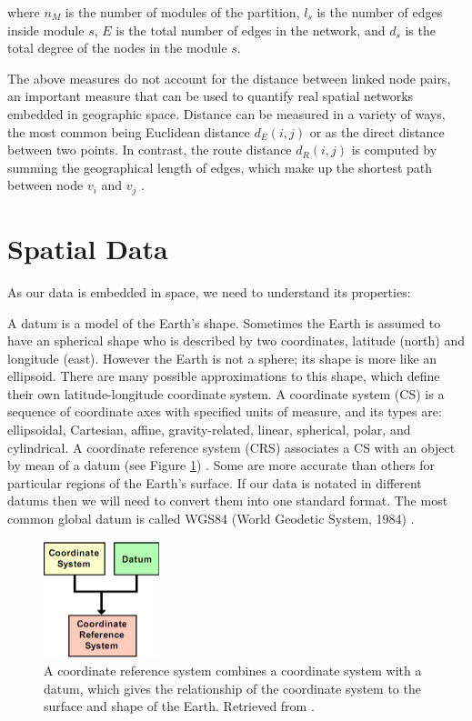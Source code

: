 where $n_M$ is the number of modules of the partition, $l_s$ is the number of edges inside module $s$, $E$ is the total number of edges in the network, and $d_s$ is the total degree of the nodes in the module $s$.

The above measures do not account for the distance between linked node pairs, an important measure that can be used to quantify real spatial networks embedded in geographic space. Distance can be measured in a variety of ways, the most common being Euclidean distance $d_E(i, j)$ or as the direct distance between two points. In contrast, the route distance $d_R(i, j)$ is computed by summing the geographical length of edges, which make up the shortest path between node $v_i$ and $v_j$ \cite{anderson_2020}.

\section{Spatial Data}

As our data is embedded in space, we need to understand its properties:

A datum is a model of the Earth's shape. Sometimes the Earth is assumed to have an spherical shape who is described by two coordinates, latitude (north) and longitude (east). However the Earth is not a sphere; its shape is more like an ellipsoid. There are many possible approximations to this shape, which define their own latitude-longitude coordinate system. A coordinate system (CS) is a sequence of coordinate axes with specified units of measure, and its types are: ellipsoidal, Cartesian, affine, gravity-related, linear, spherical, polar, and cylindrical. A coordinate reference system (CRS) associates a CS with an object by mean of a datum (see Figure \ref{fig:crs-datum}) \cite{nikolli_CRS_2011}. Some are more accurate than others for particular regions of the Earth's surface.  If our data is notated in different datums then we will need to convert them into one standard format. The most common global datum is called WGS84 (World Geodetic System, 1984) \cite{fox_spatial_2018}.

\begin{figure}[h!]
	\centering
	\includegraphics[width=0.3\textwidth]{Figures/coordinate system-datum_nikolli2011.png}
	\caption{A coordinate reference system combines a coordinate system with a datum, which gives the relationship of the coordinate system to the surface and shape of the Earth. Retrieved from \cite{nikolli_CRS_2011}.
		\label{fig:crs-datum}}
\end{figure}

